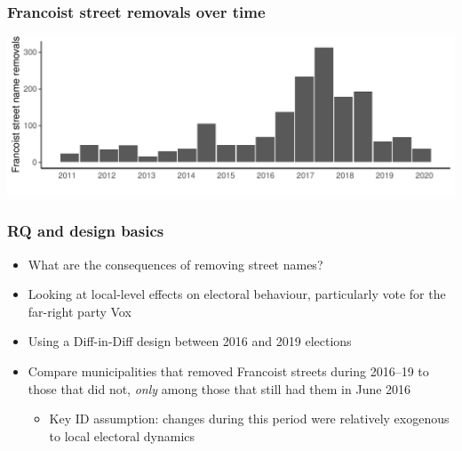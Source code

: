 \documentclass[aspectratio=43]{beamer}
\begin{document}
\begin{frame}
\frametitle{Francoist street removals over time}
\centering

\includegraphics[width = \textwidth]{../descriptives/output/changes_by_year}

\end{frame}

\begin{frame}
\frametitle{RQ and design basics}
\centering

\begin{itemize}[<+->]
  \item What are the consequences of removing street names?
  \item Looking at local-level effects on electoral behaviour, particularly vote for the far-right party Vox
  \item Using a Diff-in-Diff design between 2016 and 2019 elections
  \item Compare municipalities that removed Francoist streets during 2016--19 to those that did not, \textit{only} among those that still had them in June 2016
  \begin{itemize}
    \item Key ID assumption: changes during this period were relatively exogenous to local electoral dynamics
  \end{itemize}
\end{itemize}

\end{frame}


\end{document}
